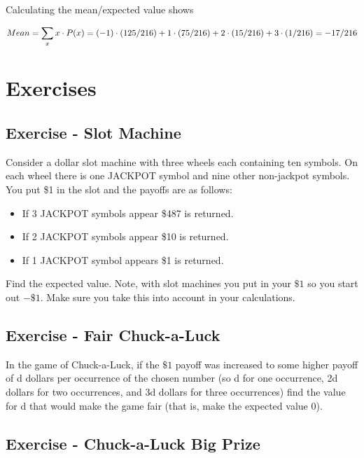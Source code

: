 \documentclass[]{book}
\providecommand{\tightlist}{%
  \setlength{\itemsep}{0pt}\setlength{\parskip}{0pt}}
\theoremstyle{definition}
\theoremstyle{definition}
\theoremstyle{definition}
\theoremstyle{remark}
\begin{document}
Calculating the mean/expected value shows

\[Mean=\sum_{x} x \cdot P(x)= \\(-1) \cdot (125/216)+1 \cdot (75/216) +2 \cdot (15/216)+3 \cdot (1/216)=-17/216 \]

\section{Exercises}\label{exercises}

\subsection{Exercise - Slot Machine}\label{exercise---slot-machine}

Consider a dollar slot machine with three wheels each containing ten
symbols. On each wheel there is one JACKPOT symbol and nine other
non-jackpot symbols. You put \$1 in the slot and the payoffs are as
follows:

\begin{itemize}
\tightlist
\item
  If 3 JACKPOT symbols appear \$487 is returned.
\item
  If 2 JACKPOT symbols appear \$10 is returned.
\item
  If 1 JACKPOT symbol appears \$1 is returned.
\end{itemize}

Find the expected value. Note, with slot machines you put in your
\(\$1\) so you start out \(-\$1\). Make sure you take this into account
in your calculations.

\subsection{Exercise - Fair
Chuck-a-Luck}\label{exercise---fair-chuck-a-luck}

In the game of Chuck-a-Luck, if the \(\$1\) payoff was increased to some
higher payoff of d dollars per occurrence of the chosen number (so d for
one occurrence, 2d dollars for two occurrences, and 3d dollars for three
occurrences) find the value for d that would make the game fair (that
is, make the expected value 0).

\subsection{Exercise - Chuck-a-Luck Big
Prize}\label{exercise---chuck-a-luck-big-prize}
\end{document}
